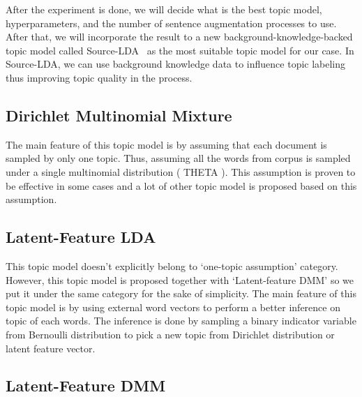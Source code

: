 \documentclass[senior]{IPSstyle}
\begin{document}
After the experiment is done, we will decide what is the best topic model, hyperparameters, and the number of sentence augmentation processes to use. After that, we will incorporate the result to a new background-knowledge-backed topic model called Source-LDA~\cite{wood} as the most suitable topic model for our case. In Source-LDA, we can use background knowledge data to influence topic labeling thus improving topic
quality in the process.

\subsection{Dirichlet Multinomial Mixture~\cite{yin}}

The main feature of this topic model is by assuming that each document is sampled by only one topic. Thus, assuming all the words from corpus is sampled under a single multinomial distribution ( THETA ). This assumption is proven to be effective in some cases and a lot of other topic model is proposed based on this assumption.

\subsection{Latent-Feature LDA~\cite{nguyen}}

This topic model doesn’t explicitly belong to ‘one-topic assumption’ category. However, this topic model is proposed together with ‘Latent-feature DMM’ so we put it under the same category for the sake of simplicity. The main feature of this topic model is by using external word vectors to perform a better inference on topic of each words. The inference is done by sampling a binary indicator variable from Bernoulli distribution to pick a new topic from Dirichlet distribution or latent feature vector.

\subsection{Latent-Feature DMM~\cite{nguyen}}
\end{document}
